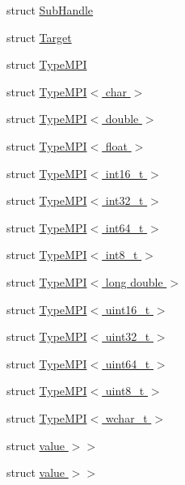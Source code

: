 \begin{DoxyCompactItemize}
struct \hyperlink{structvt_1_1rdma_1_1_sub_handle}{Sub\+Handle}
\item 
struct \hyperlink{structvt_1_1rdma_1_1_target}{Target}
\item 
struct \hyperlink{structvt_1_1rdma_1_1_type_m_p_i}{Type\+M\+PI}
\item 
struct \hyperlink{structvt_1_1rdma_1_1_type_m_p_i_3_01char_01_4}{Type\+M\+P\+I$<$ char $>$}
\item 
struct \hyperlink{structvt_1_1rdma_1_1_type_m_p_i_3_01double_01_4}{Type\+M\+P\+I$<$ double $>$}
\item 
struct \hyperlink{structvt_1_1rdma_1_1_type_m_p_i_3_01float_01_4}{Type\+M\+P\+I$<$ float $>$}
\item 
struct \hyperlink{structvt_1_1rdma_1_1_type_m_p_i_3_01int16__t_01_4}{Type\+M\+P\+I$<$ int16\+\_\+t $>$}
\item 
struct \hyperlink{structvt_1_1rdma_1_1_type_m_p_i_3_01int32__t_01_4}{Type\+M\+P\+I$<$ int32\+\_\+t $>$}
\item 
struct \hyperlink{structvt_1_1rdma_1_1_type_m_p_i_3_01int64__t_01_4}{Type\+M\+P\+I$<$ int64\+\_\+t $>$}
\item 
struct \hyperlink{structvt_1_1rdma_1_1_type_m_p_i_3_01int8__t_01_4}{Type\+M\+P\+I$<$ int8\+\_\+t $>$}
\item 
struct \hyperlink{structvt_1_1rdma_1_1_type_m_p_i_3_01long_01double_01_4}{Type\+M\+P\+I$<$ long double $>$}
\item 
struct \hyperlink{structvt_1_1rdma_1_1_type_m_p_i_3_01uint16__t_01_4}{Type\+M\+P\+I$<$ uint16\+\_\+t $>$}
\item 
struct \hyperlink{structvt_1_1rdma_1_1_type_m_p_i_3_01uint32__t_01_4}{Type\+M\+P\+I$<$ uint32\+\_\+t $>$}
\item 
struct \hyperlink{structvt_1_1rdma_1_1_type_m_p_i_3_01uint64__t_01_4}{Type\+M\+P\+I$<$ uint64\+\_\+t $>$}
\item 
struct \hyperlink{structvt_1_1rdma_1_1_type_m_p_i_3_01uint8__t_01_4}{Type\+M\+P\+I$<$ uint8\+\_\+t $>$}
\item 
struct \hyperlink{structvt_1_1rdma_1_1_type_m_p_i_3_01wchar__t_01_4}{Type\+M\+P\+I$<$ wchar\+\_\+t $>$}
\item 
struct \hyperlink{structvt_1_1rdma_1_1_handle_3_01_t_00_01_e_00_01_index_t_00_01typename_01std_1_1enable__if__t_3_f66c3940d9f3649c3a5c3e77d63c658a}{value $>$$>$}
\item 
struct \hyperlink{structvt_1_1rdma_1_1_handle_3_01_t_00_01_e_00_01_index_t_00_01typename_01std_1_1enable__if__t_3_d15dac1b5db6e2bc0fb0b8aca42b1456}{value $>$$>$}
\end{DoxyCompactItemize}
